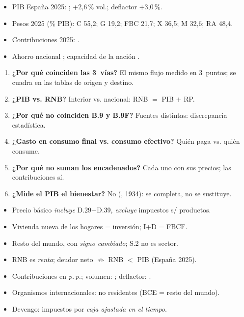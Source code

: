 \documentclass{article}
\begin{document}
\begin{columnas}
\anexorepaso
{}
\begin{itemize}
\item PIB España 2025: ; +2,6\,\% vol.; deflactor +3,0\,\%.
\item Pesos 2025 (\% PIB): C 55,2; G 19,2; FBC 21,7; X 36,5; M 32,6; RA 48,4.
\item Contribuciones 2025: .
\item Ahorro nacional ; capacidad de la nación .
\end{itemize}
\begin{enumerate}
\item \textbf{¿Por qué coinciden las 3~vías?} El mismo flujo medido en 3~puntos; se cuadra en las tablas de origen y destino.
\item \textbf{¿PIB vs. RNB?} Interior vs. nacional: RNB $=$ PIB $+$ RP.
\item \textbf{¿Por qué no coinciden B.9 y B.9F?} Fuentes distintas: discrepancia estadística.
\item \textbf{¿Gasto en consumo final vs. consumo efectivo?} Quién paga vs. quién consume.
\item \textbf{¿Por qué no suman los encadenados?} Cada uno con sus precios; las contribuciones sí.
\item \textbf{¿Mide el PIB el bienestar?} No (, 1934): se completa, no se sustituye.
\end{enumerate}
\begin{trampa}
\begin{itemize}
\item Precio básico \emph{incluye} D.29$-$D.39, \emph{excluye} impuestos s/ productos.
\item Vivienda nueva de los hogares = inversión; I+D = FBCF.
\item Resto del mundo, con \emph{signo cambiado}; S.2 no es sector.
\item RNB es \emph{renta}; deudor neto $\not\Rightarrow$ RNB $<$ PIB (España 2025).
\item Contribuciones en \emph{p.\,p.}; volumen: ; deflactor: .
\item Organismos internacionales: no residentes (BCE = resto del mundo).
\item Devengo: impuestos por \emph{caja ajustada en el tiempo}.
\end{itemize}
\end{trampa}

\end{columnas}
\end{document}
